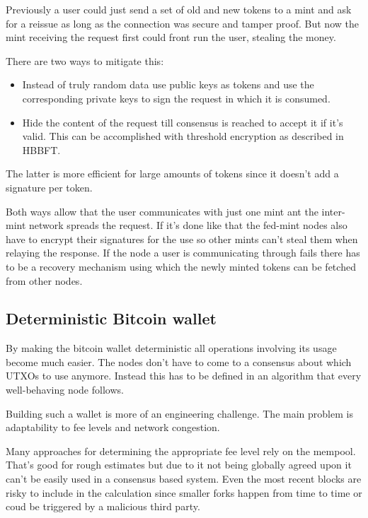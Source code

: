 \documentclass[10pt,a4paper,twocolumn]{article}
\begin{document}
Previously a user could just send a set of old and new tokens to a mint and ask for a reissue as long as the connection was secure and tamper proof. But now the mint receiving the request first could front run the user, stealing the money.

There are two ways to mitigate this:
\begin{itemize}
	\item Instead of truly random data use public keys as tokens and use the corresponding private keys to sign the request in which it is consumed.
	\item Hide the content of the request till consensus is reached to accept it if it's valid. This can be accomplished with threshold encryption as described in HBBFT. %
\end{itemize}

The latter is more efficient for large amounts of tokens since it doesn't add a signature per token.

Both ways allow that the user communicates with just one mint ant the inter-mint network spreads the request. If it's done like that the fed-mint nodes also have to encrypt their signatures for the use so other mints can't steal them when relaying the response. If the node a user is communicating through fails there has to be a recovery mechanism using which the newly minted tokens can be fetched from other nodes.

\subsection{Deterministic Bitcoin wallet}
By making the bitcoin wallet deterministic all operations involving its usage become much easier.
The nodes don't have to come to a consensus about which UTXOs to use anymore.
Instead this has to be defined in an algorithm that every well-behaving node follows.

Building such a wallet is more of an engineering challenge.
The main problem is adaptability to fee levels and network congestion.

Many approaches for determining the appropriate fee level rely on the mempool.
That's good for rough estimates but due to it not being globally agreed upon it can't be easily used in a consensus based system.
Even the most recent blocks are risky to include in the calculation since smaller forks happen from time to time or coud be triggered by a malicious third party.
\end{document}
